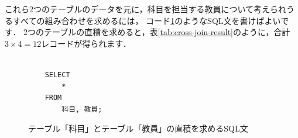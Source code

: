 これら2つのテーブルのデータを元に，科目を担当する教員について考えられうるすべての組み合わせを求めるには， コード\ref{code:sql-cross-join3}のようなSQL文を書けばよいです．
2つのテーブルの直積を求めると，表\ref{tab:cross-join-result}のように，合計$3 \times 4=12$レコードが得られます．
\begin{figure}[!htbp]
    \begin{verbatim}

    SELECT
        *
    FROM
        科目, 教員;

    \end{verbatim}
    \captionsetup{name=コード}
    \caption{テーブル「科目」とテーブル「教員」の直積を求めるSQL文}
    \label{code:sql-cross-join3}
\end{figure}
\begin{table}[!htbp]
    \centering
    \caption{テーブル「科目」とテーブル「教員」の直積を求めるSQL文の実行結果}
    \label{tab:cross-join-result}
\end{table}

